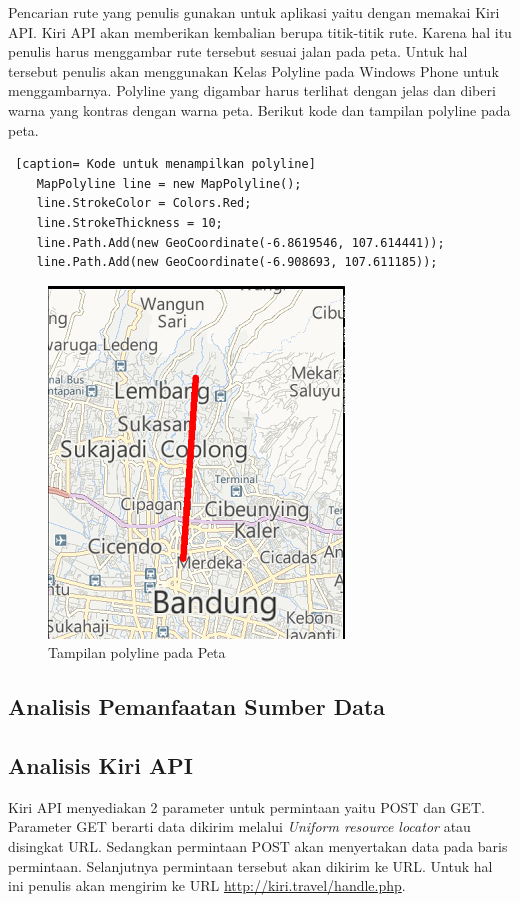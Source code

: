 \hspace{0.5cm} Pencarian rute yang penulis gunakan untuk aplikasi yaitu dengan memakai Kiri API. Kiri API akan memberikan kembalian berupa titik-titik rute. Karena hal itu penulis harus menggambar rute tersebut sesuai jalan pada peta. Untuk hal tersebut penulis akan menggunakan Kelas Polyline pada Windows Phone untuk menggambarnya. Polyline yang digambar harus terlihat dengan jelas dan diberi warna yang kontras dengan warna peta. Berikut kode dan tampilan polyline pada peta.

\begin{lstlisting} [caption= Kode untuk menampilkan polyline]
	MapPolyline line = new MapPolyline();
	line.StrokeColor = Colors.Red;
	line.StrokeThickness = 10;
	line.Path.Add(new GeoCoordinate(-6.8619546, 107.614441));
	line.Path.Add(new GeoCoordinate(-6.908693, 107.611185));
\end{lstlisting}

\begin{figure}[h]
	\centering
		\includegraphics[scale=0.5]{Gambar/kontrol/polyline}
	\caption{Tampilan polyline pada Peta}
	\label{fig:Tampilan polyline pada Peta}
\end{figure}

\subsection{Analisis Pemanfaatan Sumber Data}
\label{lab:Analisis Pemanfaatan Sumber Data}

\subsection{Analisis Kiri API}
\label{lab:Analisis Kiri API}
\hspace{0.5cm} Kiri API menyediakan 2 parameter untuk permintaan yaitu POST dan GET. Parameter GET berarti data dikirim melalui \textit{Uniform resource locator} atau disingkat URL. Sedangkan permintaan POST akan menyertakan data pada baris permintaan. Selanjutnya permintaan tersebut akan dikirim ke URL. Untuk hal ini penulis akan mengirim ke URL \url{ http://kiri.travel/handle.php}.

